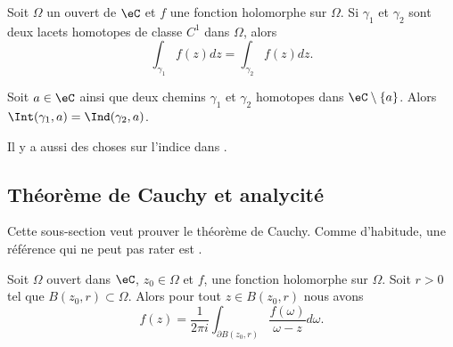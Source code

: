 \begin{theorem}
    Soit \( \Omega\) un ouvert de \( \eC\) et \( f\) une fonction holomorphe sur \( \Omega\). Si \( \gamma_1\) et \( \gamma_2\) sont deux lacets homotopes de classe \( C^1\) dans \( \Omega\), alors
    \begin{equation}
        \int_{\gamma_1}f(z)dz=\int_{\gamma_2}f(z)dz.
    \end{equation}
\end{theorem}

\begin{corollary}   \label{CorGZXzuZR}
    Soit \( a\in \eC\) ainsi que deux chemins \( \gamma_1\) et \( \gamma_2\) homotopes dans \( \eC\setminus\{ a \}\). Alors \( \Int(\gamma_1,a)=\Ind(\gamma_2,a)\).
\end{corollary}
Il y a aussi des choses sur l'indice dans \cite{Holomorphieus}.


\subsection{Théorème de Cauchy et analycité}

Cette sous-section veut prouver le théorème de Cauchy. Comme d'habitude, une référence qui ne peut pas rater est \cite{Holomorphieus}.


\begin{theorem}    \label{ThoUHztQe}
    Soit \( \Omega\) ouvert dans \( \eC\), \( z_0\in \Omega\) et \( f\), une fonction holomorphe sur \( \Omega\). Soit \( r>0\) tel que \( B(z_0,r)\subset \Omega\). Alors pour tout \( z\in B(z_0,r)\) nous avons
    \begin{equation}    \label{EqPzUABM}
        f(z)=\frac{1}{ 2\pi i }\int_{\partial B(z_0,r)}\frac{ f(\omega) }{ \omega-z }d\omega.
    \end{equation}
\end{theorem}


